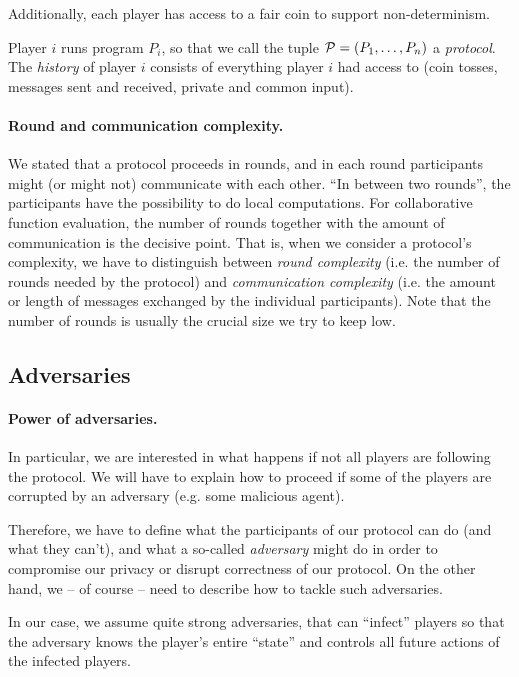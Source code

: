 Additionally, each player has access to a fair coin to support non-determinism.

Player $i$ runs program $P_i$, so that we call the tuple ${\cal P}=(P_1,\dots,P_n)$ a \emph{protocol}. The \emph{history} of player $i$ consists of everything player $i$ had access to (coin tosses, messages sent and received, private and common input).

\paragraph{Round and communication complexity.}

We stated that a protocol proceeds in rounds, and in each round participants might (or might not) communicate with each other. ``In between two rounds'', the participants have the possibility to do local computations. For collaborative function evaluation, the number of rounds together with the amount of communication is the decisive point. That is, when we consider a protocol's complexity, we have to distinguish between \emph{round complexity} (i.e. the number of rounds needed by the protocol) and \emph{communication complexity} (i.e. the amount or length of messages exchanged by the individual participants). Note that the number of rounds is usually the crucial size we try to keep low.

\subsection{Adversaries}
\label{sec:adversaries-more-detail}

\paragraph{Power of adversaries.}

In particular, we are interested in what happens if not all players are following the protocol. We will have to explain how to proceed if some of the players are corrupted by an adversary (e.g. some malicious agent).

Therefore, we have to define what the participants of our protocol can do (and what they can't), and what a so-called \emph{adversary} might do in order to compromise our privacy or disrupt correctness of our protocol. On the other hand, we -- of course -- need to describe how to tackle such adversaries.

In our case, we assume quite strong adversaries, that can ``infect'' players so that the adversary knows the player's entire ``state'' and controls all future actions of the infected players. 

